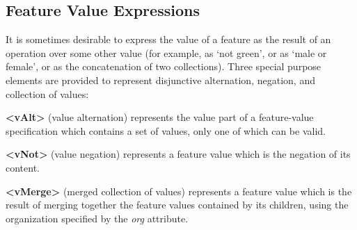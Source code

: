 \subsection[{Feature Value Expressions}]{Feature Value Expressions}\label{FVE}\par
It is sometimes desirable to express the value of a feature as the result of an operation over some other value (for example, as ‘not green’, or as ‘male or female’, or as the concatenation of two collections). Three special purpose elements are provided to represent disjunctive alternation, negation, and collection of values: 
\begin{sansreflist}
  
\item [\textbf{<vAlt>}] (value alternation) represents the value part of a feature-value specification which contains a set of values, only one of which can be valid.
\item [\textbf{<vNot>}] (value negation) represents a feature value which is the negation of its content.
\item [\textbf{<vMerge>}] (merged collection of values) represents a feature value which is the result of merging together the feature values contained by its children, using the organization specified by the {\itshape org} attribute.
\end{sansreflist}

